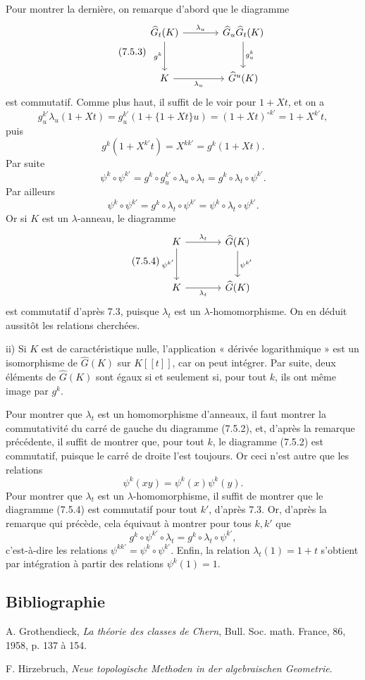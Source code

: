 \documentclass[11pt]{article}
\begin{document}
Pour montrer la dernière, on remarque d'abord que le diagramme
\begin{equation}\tag{7.5.3}
\begin{tikzcd}[column sep=large,row sep=large]
\widehat G_t(K) \arrow[r,"\lambda_u"] \arrow[d,"g^k"'] &
\widehat G_u\widehat G_t(K) \arrow[d,"g^k_u"]\\
K \arrow[r,"\lambda_u"'] &
\widehat G^u(K)
\end{tikzcd}
\end{equation}
est commutatif. Comme plus haut, il suffit de le voir pour \(1+Xt\), et on a
\[
  g^{k'}_u\lambda_u(1+Xt)
  =
  g^{k'}_u(1+\{1+Xt\}u)
  =
  (1+Xt)^{\circ k'}
  =
  1+X^{k'}t,
\]
puis
\[
  g^k(1+X^{k'}t)=X^{kk'}=g^k(1+Xt).
\]
Par suite
\[
  \psi^k\circ\psi^{k'}
  =
  g^k\circ g^{k'}_u\circ\lambda_u\circ\lambda_t
  =
  g^k\circ\lambda_t\circ\psi^{k'}.
\]
Par ailleurs
\[
  \psi^k\circ\psi^{k'}
  =
  g^k\circ\lambda_t\circ\psi^{k'}
  =
  \psi^k\circ\lambda_t\circ\psi^{k'}.
\]
Or si \(K\) est un \(\lambda\)-anneau, le diagramme
\begin{equation}\tag{7.5.4}
\begin{tikzcd}[column sep=large,row sep=large]
K \arrow[r,"\lambda_t"] \arrow[d,"\psi^{k'}"'] &
\widehat G(K) \arrow[d,"\psi^{k'}"]\\
K \arrow[r,"\lambda_t"'] &
\widehat G(K)
\end{tikzcd}
\end{equation}
est commutatif d'après 7.3, puisque \(\lambda_t\) est un \(\lambda\)-homomorphisme. On en déduit aussitôt les relations cherchées.

ii) Si \(K\) est de caractéristique nulle, l'application « dérivée logarithmique » est un isomorphisme de \(\widehat G(K)\) sur \(K[[t]]\), car on peut intégrer. Par suite, deux éléments de \(\widehat G(K)\) sont égaux si et seulement si, pour tout \(k\), ils ont même image par \(g^k\).

Pour montrer que \(\lambda_t\) est un homomorphisme d'anneaux, il faut montrer la commutativité du carré de gauche du diagramme (7.5.2), et, d'après la remarque précédente, il suffit de montrer que, pour tout \(k\), le diagramme (7.5.2) est commutatif, puisque le carré de droite l'est toujours. Or ceci n'est autre que les relations
\[
  \psi^k(xy)=\psi^k(x)\psi^k(y).
\]
Pour montrer que \(\lambda_t\) est un \(\lambda\)-homomorphisme, il suffit de montrer que le diagramme (7.5.4) est commutatif pour tout \(k'\), d'après 7.3. Or, d'après la remarque qui précède, cela équivaut à montrer pour tous \(k,k'\) que
\[
  g^k\circ\psi^{k'}\circ\lambda_t
  =
  g^k\circ\lambda_t\circ\psi^{k'},
\]
c'est-à-dire les relations \(\psi^{kk'}=\psi^k\circ\psi^{k'}\). Enfin, la relation \(\lambda_t(1)=1+t\) s'obtient par intégration à partir des relations \(\psi^k(1)=1\).

\subsection*{Bibliographie}
\begin{enumerate}[label={[\arabic*]}]
\item A. Grothendieck, \emph{La théorie des classes de Chern}, Bull. Soc. math. France, 86, 1958, p. 137 à 154.
\item F. Hirzebruch, \emph{Neue topologische Methoden in der algebraischen Geometrie}.
\end{enumerate}
\end{document}
